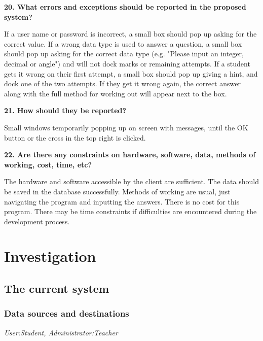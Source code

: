 \textbf{20. What errors and exceptions should be reported in the proposed system?}

If a user name or password is incorrect, a small box should pop up asking for the correct value. If a wrong data type is used to answer a question, a small box should pop up asking for the correct data type (e.g. "Please input an integer, decimal or angle") and will not dock marks or remaining attempts. If a student gets it wrong on their first attempt, a small box should pop up giving a hint, and dock one of the two attempts. If they get it wrong again, the correct answer along with the full method for working out will appear next to the box.

\textbf{21. How should they be reported?}

Small windows temporarily popping up on screen with messages, until the OK button or the cross in the top right is clicked.

\textbf{22. Are there any constraints on hardware, software, data, methods of working, cost, time, etc?}

The hardware and software accessible by the client are sufficient. The data should be saved in the database successfully. Methods of working are usual, just navigating the program and inputting the answers. There is no cost for this program. There may be time constraints if difficulties are encountered during the development process.

\section{Investigation}

\subsection{The current system}

\subsubsection{Data sources and destinations}

\textit{User:Student, Administrator:Teacher}


